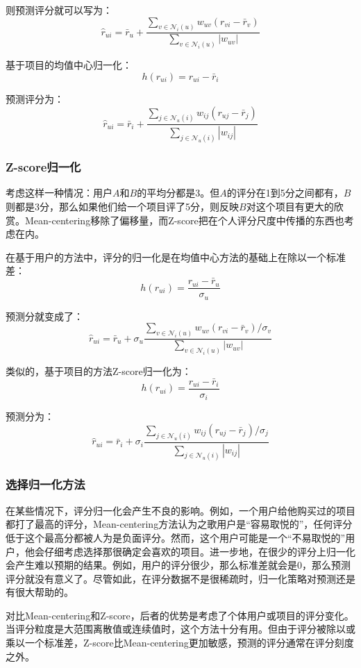 \documentclass{article}
\begin{document}
 则预测评分就可以写为：
 $$ \hat{r}_{ui}=\bar{r}_u+\frac{\mathop{\sum}\limits_{v\in\mathcal{N}_i(u)}w_{uv}(r_{vi}-\bar{r}_{v})}{\mathop{\sum}\limits_{v\in\mathcal{N}_i(u)}|w_{uv}|} $$

 基于项目的均值中心归一化：
 $$ h(r_{ui})=r_{ui}-\bar{r}_i $$

 预测评分为：
 $$ \hat{r}_{ui}=\bar{r}_i+\frac{\mathop{\sum}\limits_{j\in\mathcal{N}_u(i)}w_{ij}(r_{uj}-\bar{r}_j)}{\mathop{\sum}\limits_{j\in\mathcal{N}_u(i)}|w_{ij}|} $$
 
 \subsubsection{Z-score归一化}
 考虑这样一种情况：用户$A$和$B$的平均分都是3。但$A$的评分在1到5分之间都有，$B$则都是3分，那么如果他们给一个项目评了5分，则反映$B$对这个项目有更大的欣赏。Mean-centering移除了偏移量，而Z-score把在个人评分尺度中传播的东西也考虑在内。

 在基于用户的方法中，评分的归一化是在均值中心方法的基础上在除以一个标准差：
 $$ h(r_{ui})=\frac{r_{ui}-\bar{r}_u}{\sigma_u} $$

 预测分就变成了：
 $$ \hat{r}_{ui}=\bar{r}_u+\sigma_u\frac{\mathop{\sum}\limits_{v\in\mathcal{N}_i(u)}w_{uv}(r_{vi}-\bar{r}_{v})/\sigma_v}{\mathop{\sum}\limits_{v\in\mathcal{N}_i(u)}|w_{uv}|} $$

 类似的，基于项目的方法Z-score归一化为：
 $$ h(r_{ui})=\frac{r_{ui}-\bar{r}_i}{\sigma_i} $$

 预测分为：
 $$ \hat{r}_{ui}=\bar{r}_i+\sigma_i\frac{\mathop{\sum}\limits_{j\in\mathcal{N}_u(i)}w_{ij}(r_{uj}-\bar{r}_j)/\sigma_j}{\mathop{\sum}\limits_{j\in\mathcal{N}_u(i)}|w_{ij}|} $$

 \subsubsection{选择归一化方法}
 在某些情况下，评分归一化会产生不良的影响。例如，一个用户给他购买过的项目都打了最高的评分，Mean-centering方法认为之歌用户是“容易取悦的”，任何评分低于这个最高分都被人为是负面评分。然而，这个用户可能是一个“不易取悦的”用户，他会仔细考虑选择那很确定会喜欢的项目。进一步地，在很少的评分上归一化会产生难以预期的结果。例如，用户的评分很少，那么标准差就会是0，那么预测评分就没有意义了。尽管如此，在评分数据不是很稀疏时，归一化策略对预测还是有很大帮助的。

 对比Mean-centering和Z-score，后者的优势是考虑了个体用户或项目的评分变化。当评分粒度是大范围离散值或连续值时，这个方法十分有用。但由于评分被除以或乘以一个标准差，Z-score比Mean-centering更加敏感，预测的评分通常在评分刻度之外。
\end{document}
